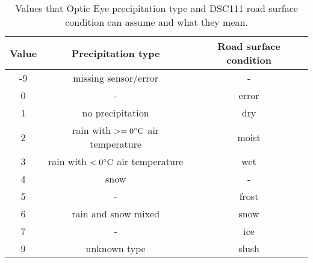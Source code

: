 \begin{table}[H]
	\centering
	\caption{Values that Optic Eye precipitation type and DSC111 road surface condition can assume and what they mean.}
		\begin{tabular}[3]{c | c | c}
    			Value & Precipitation type & Road surface condition \\
    			\hline
			-9 & missing sensor/error & - \\
			0 & - & error\\
			1 & no precipitation & dry \\
			2 & rain with $>= 0 \celsius$ air temperature & moist \\
			3 & rain with $< 0 \celsius$ air temperature & wet \\
			4 & snow & - \\
			5 & - & frost \\
			6 & rain and snow mixed  & snow \\
			7 & - & ice \\
			9 & unknown type  & slush 
			\label{table:discretevalues}
		\end{tabular}
\end{table}

